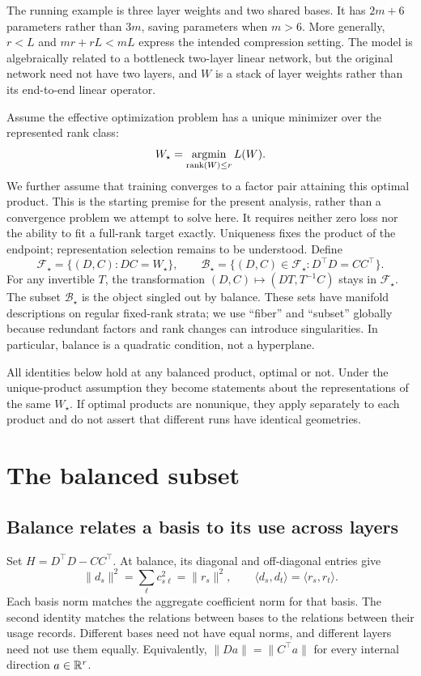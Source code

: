 The running example is three layer weights and two shared bases. It has $2m+6$ parameters rather than $3m$, saving parameters when $m>6$. More generally, $r<L$ and $mr+rL<mL$ express the intended compression setting. The model is algebraically related to a bottleneck two-layer linear network, but the original network need not have two layers, and $W$ is a stack of layer weights rather than its end-to-end linear operator.

Assume the effective optimization problem has a unique minimizer over the represented rank class:
\begin{equation}
 W_\star=\mathop{\rm argmin}_{\operatorname{rank}(W)\leq r} L(W).
\end{equation}
We further assume that training converges to a factor pair attaining this optimal product. This is the starting premise for the present analysis, rather than a convergence problem we attempt to solve here. It requires neither zero loss nor the ability to fit a full-rank target exactly. Uniqueness fixes the product of the endpoint; representation selection remains to be understood. Define
\begin{equation}
 \mathcal F_\star=\{(D,C):DC=W_\star\},\qquad
 \mathcal B_\star=\{(D,C)\in\mathcal F_\star:D^\top D=CC^\top\}.
\end{equation}
For any invertible $T$, the transformation $(D,C)\mapsto(DT,T^{-1}C)$ stays in $\mathcal F_\star$. The subset $\mathcal B_\star$ is the object singled out by balance. These sets have manifold descriptions on regular fixed-rank strata; we use ``fiber'' and ``subset'' globally because redundant factors and rank changes can introduce singularities. In particular, balance is a quadratic condition, not a hyperplane.

All identities below hold at any balanced product, optimal or not. Under the unique-product assumption they become statements about the representations of the same $W_\star$. If optimal products are nonunique, they apply separately to each product and do not assert that different runs have identical geometries.

\section{The balanced subset}
\subsection{Balance relates a basis to its use across layers}
Set $H=D^\top D-CC^\top$. At balance, its diagonal and off-diagonal entries give
\begin{equation}\label{eq:direct}
 \|d_s\|^2=\sum_\ell c_{s\ell}^2=\|r_s\|^2,
 \qquad \langle d_s,d_t\rangle=\langle r_s,r_t\rangle.
\end{equation}
Each basis norm matches the aggregate coefficient norm for that basis. The second identity matches the relations between bases to the relations between their usage records. Different bases need not have equal norms, and different layers need not use them equally. Equivalently, $\|Da\|=\|C^\top a\|$ for every internal direction $a\in\mathbb R^r$.

